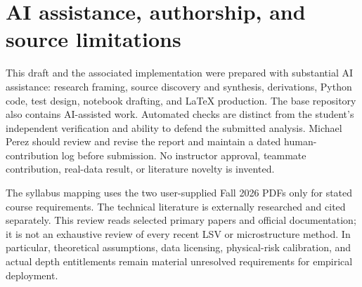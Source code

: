 \section*{AI assistance, authorship, and source limitations}
This draft and the associated implementation were prepared with substantial AI assistance: research framing, source discovery and synthesis, derivations, Python code, test design, notebook drafting, and LaTeX production. The base repository also contains AI-assisted work. Automated checks are distinct from the student's independent verification and ability to defend the submitted analysis. Michael Perez should review and revise the report and maintain a dated human-contribution log before submission. No instructor approval, teammate contribution, real-data result, or literature novelty is invented.

The syllabus mapping uses the two user-supplied Fall 2026 PDFs only for stated course requirements. The technical literature is externally researched and cited separately. This review reads selected primary papers and official documentation; it is not an exhaustive review of every recent LSV or microstructure method. In particular, theoretical assumptions, data licensing, physical-risk calibration, and actual depth entitlements remain material unresolved requirements for empirical deployment.

